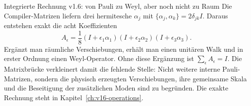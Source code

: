 \begin{bild}{Integrierte Rechnung v1.6: von Pauli zu Weyl, aber noch nicht zu Raum}
Die Compiler-Matrizen liefern drei hermitesche $\alpha_j$ mit $\{\alpha_j,\alpha_k\}=2\delta_{jk}I$. Daraus entstehen exakt die acht Koeffizienten
\[
A_\epsilon=\frac18(I+\epsilon_1\alpha_1)(I+\epsilon_2\alpha_2)(I+\epsilon_3\alpha_3).
\]
Ergänzt man räumliche Verschiebungen, erhält man einen unitären Walk und in erster Ordnung einen Weyl-Operator. Ohne diese Ergänzung ist $\sum_\epsilon A_\epsilon=I$. Die Matrixbrücke verkleinert damit die fehlende Stelle: Nicht weitere interne Pauli-Matrizen, sondern die physisch erzeugten Verschiebungen, ihre gemeinsame Skala und die Beseitigung der zusätzlichen Moden sind zu begründen. Die exakte Rechnung steht in Kapitel~\ref{ch:v16-operations}.
\end{bild}
